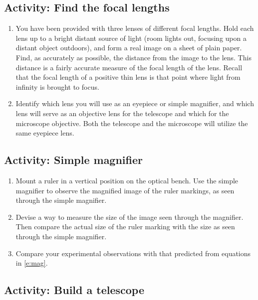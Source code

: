 \subsection{Activity: Find the focal lengths}
\begin{enumerate}
	\item You have been provided with three lenses of different focal lengths.  Hold each lens up to a bright distant source of light (room lights out, focusing upon a distant object outdoors), and form a real image on a sheet of plain paper. Find, as accurately as possible, the distance from the image to the lens. This distance is a fairly accurate measure of the focal length of the lens. Recall that the focal length of a positive thin lens is that point where light from infinity is brought to focus. 

	\item Identify which lens you will use as an eyepiece or simple magnifier, and which lens will serve as an objective lens for the telescope and which for the microscope objective. Both the telescope and the microscope will utilize the same eyepiece lens.
\end{enumerate}

\subsection{Activity: Simple magnifier}
\begin{enumerate}
	 \item Mount a ruler in a vertical position on the optical bench. Use the simple magnifier to observe the magnified image of the ruler markings, as seen through the simple magnifier.
	 \item  Devise a way to measure the size of the image seen through the magnifier. Then compare the actual size of the ruler marking with the size as seen through the simple magnifier. 
	 \item Compare your experimental observations with that predicted from equations in \ref{e:mag}.
\end{enumerate}

\subsection{Activity: Build a telescope}
 
